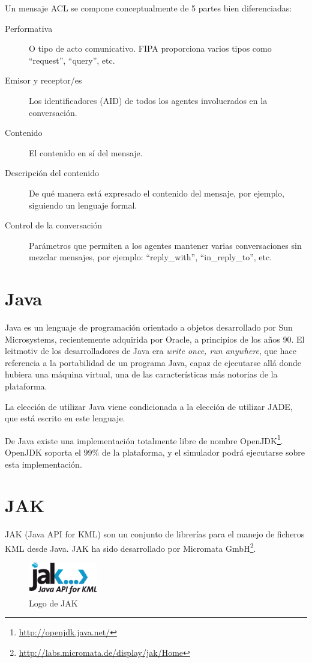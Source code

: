Un mensaje ACL se compone conceptualmente de 5 partes bien diferenciadas:

\begin{description}
 \item[Performativa] O tipo de acto comunicativo. FIPA proporciona varios tipos
 como ``request'', ``query'', etc.
 \item[Emisor y receptor/es] Los identificadores (AID) de todos los agentes
 involucrados en la conversación.
 \item[Contenido] El contenido en sí del mensaje.
 \item[Descripción del contenido] De qué manera está expresado el contenido del
 mensaje, por ejemplo, siguiendo un lenguaje formal.
 \item[Control de la conversación] Parámetros que permiten a los agentes
 mantener varias conversaciones sin mezclar mensajes, por ejemplo:
 ``reply\_with'', ``in\_reply\_to'', etc.
\end{description}

\section*{Java}

Java es un lenguaje de programación orientado a objetos desarrollado por Sun
Microsystems, recientemente adquirida por Oracle, a principios de los años 90.
El leitmotiv de los desarrolladores de Java era {\em write once, run anywhere},
que hace referencia a la portabilidad de un programa Java, capaz de ejecutarse
allá donde hubiera una máquina virtual, una de las características más notorias
de la plataforma.

La elección de utilizar Java viene condicionada a la elección de utilizar JADE,
que está escrito en este lenguaje.

De Java existe una implementación totalmente libre de nombre
OpenJDK\footnote{\url{http://openjdk.java.net/}}. OpenJDK soporta el 99\% de la
plataforma, y el simulador podrá ejecutarse sobre esta implementación.

\section*{JAK}

JAK (Java API for KML) son un conjunto de librerías para el manejo de ficheros
KML desde Java. JAK ha sido desarrollado por Micromata
GmbH\footnote{\url{http://labs.micromata.de/display/jak/Home}}.

\begin{figure}[H]
 \centering
 \includegraphics[width=30mm]{figuras/cap4/jak.png}
 \caption{Logo de JAK}
\end{figure}

